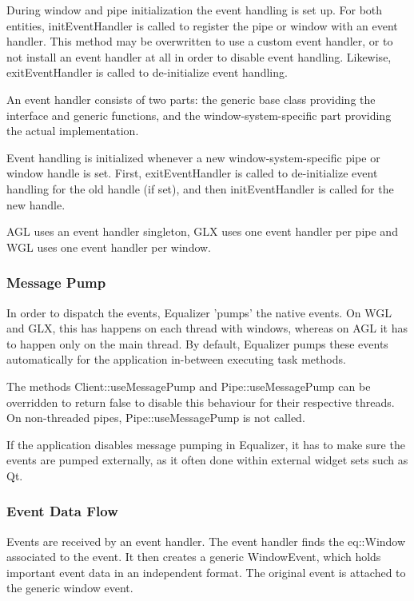 \documentclass[10pt,a4]{scrartcl}
\begin{document}
During window and pipe initialization the event handling is set up. For
both entities, \textsf{initEvent\-Handler} is called to register the
pipe or window with an event handler. This method may be overwritten to
use a custom event handler, or to not install an event handler at all in
order to disable event handling. Likewise, \textsf{exitEventHandler} is
called to de-initialize event handling.

An event handler consists of two parts: the generic base class providing
the interface and generic functions, and the window-system-specific
part providing the actual implementation. 

Event handling is initialized whenever a new window-system-specific
pipe or window handle is set. First, \textsf{exitEventHandler} is called
to de-initialize event handling for the old handle (if set), and then
\textsf{initEvent\-Handler} is called for the new handle. 

AGL uses an event handler singleton, GLX uses one event handler per pipe
and WGL uses one event handler per window.

\subsubsection{Message Pump}

In order to dispatch the events, Equalizer 'pumps' the native events. On
WGL and GLX, this has happens on each thread with windows, whereas on
AGL it has to happen only on the main thread. By default, Equalizer
pumps these events automatically for the application in-between
executing task methods.

The methods \textsf{Client::useMessagePump} and
\textsf{Pipe::useMessagePump} can be overridden to return \textsf{false}
to disable this behaviour for their respective threads. On non-threaded
pipes, \textsf{Pipe::useMessagePump} is not called.

If the application disables message pumping in Equalizer, it has to make
sure the events are pumped externally, as it often done within external
widget sets such as Qt.


\subsubsection{Event Data Flow}

Events are received by an event handler. The event handler finds the
\textsf{eq::Window} associated to the event. It then creates a generic
\textsf{WindowEvent}, which holds important event data in an independent
format. The original event is attached to the generic window event.
\end{document}
